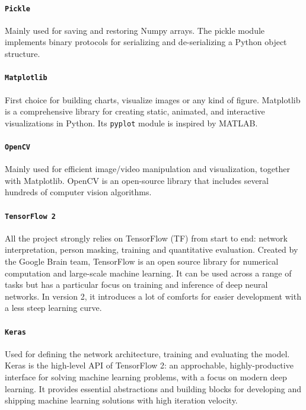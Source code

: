 \paragraph*{\texttt{Pickle}}
Mainly used for saving and restoring Numpy arrays. The pickle module implements binary protocols for serializing and de-serializing a Python object structure. 

\paragraph*{\texttt{Matplotlib}}
First choice for building charts, visualize images or any kind of figure. Matplotlib is a comprehensive library for creating static, animated, and interactive visualizations in Python. Its \texttt{pyplot} module is inspired by MATLAB.

\paragraph*{\texttt{OpenCV}}
Mainly used for efficient image/video manipulation and visualization, together with Matplotlib. OpenCV is an open-source library that includes several hundreds of computer vision algorithms.

\paragraph*{\texttt{TensorFlow 2}}
All the project strongly relies on TensorFlow (TF) from start to end: network interpretation, person masking, training and quantitative evaluation. Created by the Google Brain team, TensorFlow is an open source library for numerical computation and large-scale machine learning. It can be used across a range of tasks but has a particular focus on training and inference of deep neural networks. In version 2, it introduces a lot of comforts for easier development with a less steep learning curve.

\paragraph*{\texttt{Keras}}
Used for defining the network architecture, training and evaluating the model. Keras is the high-level API of TensorFlow 2: an approchable, highly-productive interface for solving machine learning problems, with a focus on modern deep learning. It provides essential abstractions and building blocks for developing and shipping machine learning solutions with high iteration velocity.

